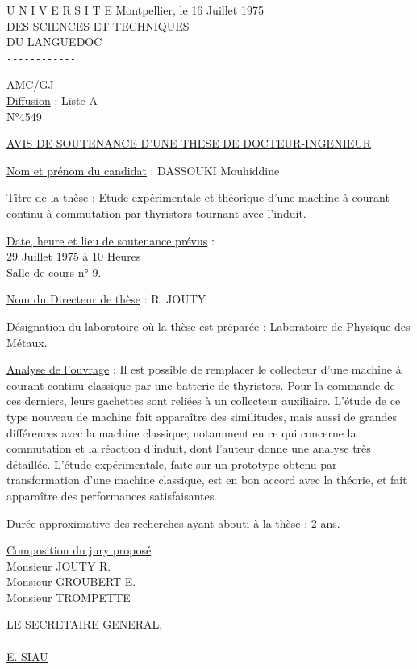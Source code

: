 U N I V E R S I T E \hfill Montpellier, le 16 Juillet 1975\\
DES SCIENCES ET TECHNIQUES\\
DU LANGUEDOC\\
\texttt{-{}-{}-{}-{}-{}-{}-{}-{}-{}-{}-{}-}

AMC/GJ\\
\uline{Diffusion} : Liste A\\
N°4549

\uline{AVIS DE SOUTENANCE D'UNE THESE DE DOCTEUR-INGENIEUR}

\uline{Nom et prénom du candidat} : DASSOUKI Mouhiddine

\uline{Titre de la thèse} : Etude expérimentale et théorique d'une machine à courant continu à commutation par thyristors tournant avec l'induit.

\uline{Date, heure et lieu de soutenance prévus} :\\
29 Juillet 1975 à 10 Heures\\
Salle de cours n° 9.

\uline{Nom du Directeur de thèse} : R. JOUTY

\uline{Désignation du laboratoire où la thèse est préparée} : Laboratoire de Physique des Métaux.

\uline{Analyse de l'ouvrage} : Il est possible de remplacer le collecteur d'une machine à courant continu classique par une batterie de thyristors. Pour la commande de ces derniers, leurs gachettes sont reliées à un collecteur auxiliaire. L'étude de ce type nouveau de machine fait apparaître des similitudes, mais aussi de grandes différences avec la machine classique; notamment en ce qui concerne la commutation et la réaction d'induit, dont l'auteur donne une analyse très détaillée. L'étude expérimentale, faite sur un prototype obtenu par transformation d'une machine classique, est en bon accord avec la théorie, et fait apparaître des performances satisfaisantes.

\uline{Durée approximative des recherches ayant abouti à la thèse} : 2 ans.

\uline{Composition du jury proposé} :\\
Monsieur JOUTY R.\\
Monsieur GROUBERT E.\\
Monsieur TROMPETTE

LE SECRETAIRE GENERAL,\\
\\
\uline{E. SIAU}
